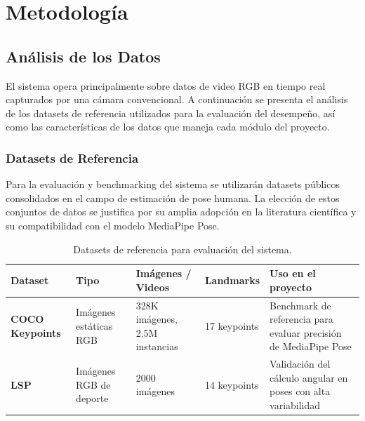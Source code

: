 \chapter{Metodología}

\section{Análisis de los Datos}

El sistema opera principalmente sobre datos de video RGB en tiempo real
capturados por una cámara convencional. A continuación se presenta el
análisis de los datasets de referencia utilizados para la evaluación del
desempeño, así como las características de los datos que maneja cada
módulo del proyecto.

\subsection{Datasets de Referencia}

Para la evaluación y benchmarking del sistema se utilizarán datasets
públicos consolidados en el campo de estimación de pose humana. La
elección de estos conjuntos de datos se justifica por su amplia adopción
en la literatura científica y su compatibilidad con el modelo MediaPipe
Pose. \cite{Bazarevskyetal2020, 10.1007/978-3-319-10602-1_48}

\begin{table}[h!]
\centering
\label{tab:datasets}
\renewcommand{\arraystretch}{1.3}
\begin{tabularx}{\textwidth}{
    >{\bfseries}p{3.5cm}
    X
    X
    X
    X
}
\toprule
\textbf{Dataset} &
\textbf{Tipo} &
\textbf{Imágenes / Videos} &
\textbf{Landmarks} &
\textbf{Uso en el proyecto} \\
\midrule
COCO Keypoints &
  Imágenes estáticas RGB &
  328K imágenes, 2.5M instancias &
  17 keypoints &
  Benchmark de referencia para evaluar precisión de MediaPipe Pose \\
\midrule
LSP &
  Imágenes RGB de deporte &
  2000 imágenes &
  14 keypoints &
  Validación del cálculo angular en poses con alta variabilidad \\
\bottomrule
\end{tabularx}
\caption{Datasets de referencia para evaluación del sistema.}
\end{table}

